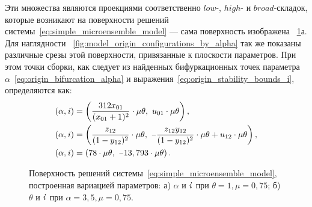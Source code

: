 Эти множества являются проекциями соответственно $low$-, $high$- и $broad$-складок, которые возникают на поверхности решений системы~\eqref{eq:simple_microensemble_model} --- сама поверхность изображена \onfigure~\ref{fig:analysis_origin_solution_surface}а. Для наглядности \onfigure~\ref{fig:model_origin_configurations_by_alpha} так же показаны различные срезы этой поверхности, привязанные к плоскости параметров. При этом точки сборки, как следует из найденных бифуркационных точек параметра $\alpha$~\eqref{eq:origin_bifurcation_alpha} и выражения~\eqref{eq:origin_stability_bounds_i}, определяются как:
\begin{equation}
    \nonumber
    \begin{aligned}
        &(\alpha, \scalar{i}) = \left( \dfrac{312 x_{01}}{(x_{01} + 1)^2} \cdot \mu \theta ,\ u_{01} \cdot \mu \theta \right), \\
        &(\alpha, \scalar{i}) = \left( \dfrac{z_{12}}{(1 - y_{12})^2} \cdot \mu \theta     ,\ \minus \dfrac{z_{12} y_{12}}{(1 - y_{12})^2} \cdot \mu \theta + u_{12} \cdot \mu \theta \right) , \\
        &(\alpha, \scalar{i}) = \left( 78 \cdot \mu \theta,\ \minus 13,793 \cdot \mu \theta \right) .
    \end{aligned}
\end{equation}

\begin{figure}[t]
    \caption{Поверхность решений системы~\eqref{eq:simple_microensemble_model}, построенная вариацией параметров: а) $\alpha$ и $\mathit{i}$ при $\theta = 1, \mu = 0,75$; б) $\theta$ и $\mathit{i}$ при $\alpha = 3,5, \mu = 0,75$.}
    \label{fig:analysis_origin_solution_surface}
\end{figure}

